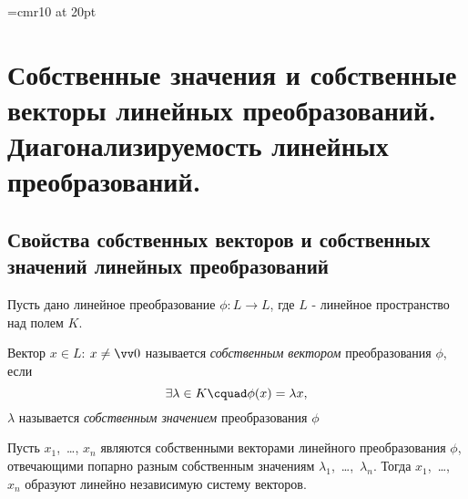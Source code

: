 \font\Large=cmr10 at 20pt
\def\fudge#1{\smash{\hbox{\Large#1}}}
\chapter{Собственные значения и собственные векторы линейных преобразований. Диагонализируемость линейных преобразований.}

\section{Свойства собственных векторов и собственных значений линейных преобразований}
Пусть дано линейное преобразование $\phi\colon L \rightarrow L$, где $L$ - линейное пространство над полем $K$.
\begin{defn}
Вектор $x \in L$: $x \neq \vv 0$ называется \textit{собственным вектором} преобразования $\phi$, если 
\begin{equation}
\exists \lambda \in K\cquad \phi(x)=\lambda x,
\end{equation}
$\lambda$ называется \textit{собственным значением} преобразования $\phi$ 
\end{defn}
\begin{thm}
Пусть $x_1$,~\ldots, $x_n$ являются собственными векторами линейного преобразования $\phi$, отвечающими попарно разным собственным значениям $\lambda_1$,~\ldots,~$\lambda_n$. Тогда $x_1$,~\ldots, $x_n$ образуют линейно независимую систему векторов.
\end{thm}
